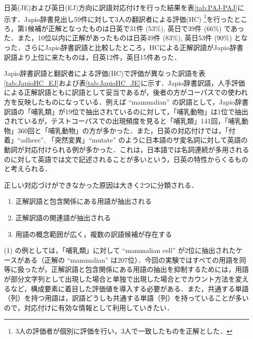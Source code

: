 \documentclass[japanese]{jnlp_1.3e}
\begin{document}
\begin{table}[t]

\end{table}
\begin{table}[t]

\end{table}

日英(JE)および英日(EJ)方向に訳語対応付けを行った結果を表\ref{tab:PAJ-PAJ}に示す．Japio辞書見出し59件に対して3人の翻訳者による評価(HC) \footnote{3人の評価者が個別に評価を行い，3人で一致したものを正解とした．}を行ったところ，第1候補が正解となったものは日英で31件 (53\%), 英日で39件 (66\%) であった．また，10位以内に正解があったものは日英49件 (83\%), 英日53件 (90\%) となった．さらにJapio辞書訳語と比較したところ，HCによる正解訳語がJapio辞書訳語より上位に来たものは，日英12件，英日15件あった．


\begin{table}[t]

\end{table}
\begin{table}[t]

\end{table}

Japio辞書訳語と翻訳者による評価(HC)で評価が異なった訳語を表\ref{tab:JapioHC_EJ}および表\ref{tab:JapioHC_JE}に示す．Japio辞書訳語，人手評価による正解訳語ともに訳語として妥当であるが，後者の方がコーパスでの使われ方を反映したものになっている．例えば ``mammalian'' の訳語として，Japio辞書訳語の「哺乳類」が19位で抽出されているのに対して，「哺乳動物」は1位で抽出されているが，テストコーパスでの出現頻度を見ると「哺乳類」141回，「哺乳動物」360回と「哺乳動物」の方が多かった．また，日英の対応付けでは，「付着」``adhere'', 「突然変異」``mutate'' のように日本語のサ変名詞に対して英語の動詞が対応付けられる例が多かった．これは，日本語では名詞連続が多用されるのに対して英語では文で記述されることが多いという，日英の特性からくるものと考えられる．


正しい対応づけができなかった原因は大きく2つに分類される．

\begin{enumerate}
\item 正解訳語と包含関係にある用語が抽出される
\item 正解訳語の関連語が抽出される
\item 用語の概念範囲が広く，複数の訳語候補が存在する
\end{enumerate}

(1) の例としては，「哺乳類」に対して ``mammalian cell'' が2位に抽出されたケースがある（正解の ``mammalian'' は207位）．今回の実験ではすべての用語を同等に扱ったが，正解訳語と包含関係にある用語の抽出を抑制するためには，用語が部分文字列として出現した場合と単独で出現した場合とでカウント方法を変えるなど，構成要素に着目した評価値を導入する必要がある．また，共通する単語（列）を持つ用語は，訳語どうしも共通する単語（列）を持っていることが多いので，対応付けに有効な情報として利用していきたい．
\end{document}
